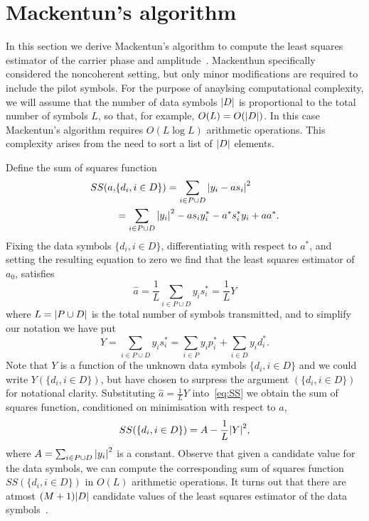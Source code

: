 \documentclass[journal]{IEEEtran}
\begin{document}
\section{Mackentun's algorithm}\label{sec:least-squar-estim}

In this section we derive Mackentun's algorithm to compute the least squares estimator of the carrier phase and amplitude~\cite{Mackenthun1994}.  Mackenthun specifically considered the noncoherent setting, but only minor modifications are required to include the pilot symbols.  For the purpose of anaylsing computational complexity, we will assume that the number of data symbols ${\left| D \right|}$ is proportional to the total number of symbols $L$, so that, for example, $O(L) = O({\left| D \right|})$.  In this case Mackentun's algorithm requires $O(L \log L)$ arithmetic operations.  This complexity arises from the need to sort a list of ${\left| D \right|}$ elements.  %

Define the sum of squares function
\begin{align}
SS(a, &\{d_i, i \in D\}) = \sum_{i \in P \cup D} {\left|  y_i - a s_i  \right|}^2 \nonumber \\
&= \sum_{i \in P \cup D} {\left| y_i \right|}^2 - a s_i y_i^* - a^* s_i^* y_i + aa^*. \label{eq:SS}
\end{align}
Fixing the data symbols $\{d_i, i \in D\}$, differentiating with respect to $a^*$, and setting the resulting equation to zero we find that the least squares estimator of $a_0$, satisfies
\begin{equation}\label{eq:hata}
\hat{a} = \frac{1}{L} \sum_{i \in P \cup D} y_i s_i^* = \frac{1}{L} Y
\end{equation}
where $L = {\left| P \cup D \right|}$ is the total number of symbols transmitted, and to simplify our notation we have put 
\[
Y = \sum_{i \in P \cup D} y_i s_i^* = \sum_{i \in P } y_i p_i^* + \sum_{i \in D } y_i d_i^*.
\]  
Note that $Y$ is a function of the unknown data symbols $\{ d_i, i \in D\}$ and we could write $Y(\{ d_i, i \in D\})$, but have chosen to surpress the argument $(\{ d_i, i \in D\})$ for notational clarity.  Substituting $\hat{a} = \frac{1}{L}Y$ into~\eqref{eq:SS} we obtain the sum of squares function, conditioned on minimisation with respect to $a$,
\begin{equation}\label{eq:SSdatasymbols}
SS(\{d_i, i \in D\}) = A - \frac{1}{L}{\left| Y \right|}^2,
\end{equation}
where $A = \sum_{i \in P \cup D}{\left| y_i \right|}^2$ is a constant.  Observe that given a candidate value for the data symbols, we can compute the corresponding sum of squares function $SS(\{d_i, i \in D\})$ in $O(L)$ arithmetic operations.  It turns out that there are atmost $(M+1){\left| D \right|}$ candidate values of the least squares estimator of the data symbols~\cite{Sweldens2001,Mackenthun1994}.  %
\end{document}
